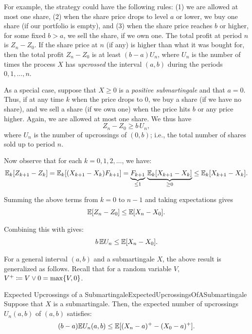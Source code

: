 For example, the strategy could have the following rules: (1) we are allowed at most one share, (2) when the share price drops to level $a$ or lower, we buy one share (if our portfolio is empty), and (3) when the share price reaches $b$ or higher, for some fixed $b > a$, we sell the share, if we own one. The total profit at period $n$ is $Z_n - Z_0$. If the share price at $n$ (if any) is higher than what it was bought for, then the total profit $Z_n - Z_0$ is at least $(b - a) U_n$, where $U_n$ is the number of times the process $X$ has \textit{upcrossed} the interval $(a, b)$ during the periods $0, 1, \dots, n$.

As a special case, suppose that $X \ge 0$ is a \textit{positive submartingale} and that $a = 0$. Thus, if at any time $k$ when the price drops to $0$, we buy a share (if we have no share), and we sell a share (if we own one) when the price hits $b$ or any price higher. Again, we are allowed at most one share. We thus have
\begin{equation}\label{eq:SpecialCaseUpcrossingProfit}
	Z_n - Z_0 \ge b \, U_n,
\end{equation}
where $U_n$ is the number of upcrossings of $(0, b)$; i.e., the total number of shares sold up to period $n$.

Now observe that for each $k = 0, 1, 2, \dots$, we have:
\begin{equation}\label{eq:PredictableIncrementBound}
	\mathbb{E}_k[Z_{k+1} - Z_k]
	= \mathbb{E}_k[(X_{k+1} - X_k) F_{k+1}]
	= \underbrace{F_{k+1}}_{\le 1} \, \underbrace{\mathbb{E}_k[X_{k+1} - X_k]}_{\ge 0}
	\le \mathbb{E}_k[X_{k+1} - X_k].
\end{equation}

Summing the above terms from $k = 0$ to $n - 1$ and taking expectations gives
\begin{equation}\label{eq:ExpectedIncrementBound}
	\mathbb{E}[Z_n - Z_0] \le \mathbb{E}[X_n - X_0].
\end{equation}

Combining this with  gives:
\begin{equation}\label{eq:ExpectedUpcrossingsSpecialCase}
	b \, \mathbb{E} U_n \le \mathbb{E}[X_n - X_0].
\end{equation}


For a general interval $(a, b)$ and a submartingale $X$, the above result is generalized as follows. Recall that for a random variable $V$, $V^+ \coloneqq V \lor 0 = \max\{V, 0\}$.


\begin{thm}{Expected Upcrossings of a Submartingale}{ExpectedUpcrossingsOfASubmartingale}
	Suppose that $X$ is a submartingale. Then, the expected number of upcrossings $U_n(a, b)$ of $(a, b)$ satisfies:
	\begin{equation}\label{eq:UpcrossingsInequality}
		(b - a) \mathbb{E} U_n(a, b) \le \mathbb{E}[(X_n - a)^+ - (X_0 - a)^+].
	\end{equation}
\end{thm}


